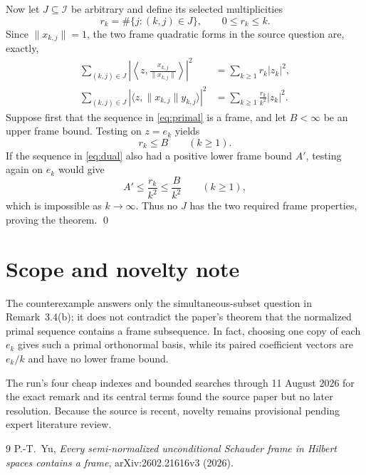 \documentclass[11pt,a4paper]{article}
\newcommand{\I}{\mathcal I}
\begin{document}
Now let $J\subseteq\I$ be arbitrary and define its selected multiplicities
\[
 r_k=\#\{j:(k,j)\in J\},\qquad 0\le r_k\le k.
\]
Since $\lVert x_{k,j}\rVert=1$, the two frame quadratic forms in the source
question are, exactly,
\begin{align}
 \sum_{(k,j)\in J}
  \left|\left\langle z,\frac{x_{k,j}}{\lVert x_{k,j}\rVert}\right\rangle\right|^2
 &=\sum_{k\ge1}r_k|z_k|^2,\label{eq:primal}\\
 \sum_{(k,j)\in J}
  |\langle z,\lVert x_{k,j}\rVert y_{k,j}\rangle|^2
 &=\sum_{k\ge1}\frac{r_k}{k^2}|z_k|^2.\label{eq:dual}
\end{align}
Suppose first that the sequence in \eqref{eq:primal} is a frame, and let
$B<\infty$ be an upper frame bound.  Testing on $z=e_k$ yields
\begin{equation}\label{eq:boundedmultiplicity}
 r_k\le B\qquad(k\ge1).
\end{equation}
If the sequence in \eqref{eq:dual} also had a positive lower frame bound
$A'$, testing again on $e_k$ would give
\[
 A'\le \frac{r_k}{k^2}\le\frac{B}{k^2}\qquad(k\ge1),
\]
which is impossible as $k\to\infty$.  Thus no $J$ has the two required frame
properties, proving the theorem. \qed

\section*{Scope and novelty note}
The counterexample answers only the simultaneous-subset question in
Remark~3.4(b); it does not contradict the paper's theorem that the normalized
primal sequence contains a frame subsequence.  In fact, choosing one copy of
each $e_k$ gives such a primal orthonormal basis, while its paired coefficient
vectors are $e_k/k$ and have no lower frame bound.

The run's four cheap indexes and bounded searches through 11 August 2026 for
the exact remark and its central terms found the source paper but no later
resolution.  Because the source is recent, novelty remains provisional
pending expert literature review.

\begin{thebibliography}{9}
P.-T.~Yu,
\emph{Every semi-normalized unconditional Schauder frame in Hilbert spaces
contains a frame}, arXiv:2602.21616v3 (2026).
\end{thebibliography}
\end{document}
